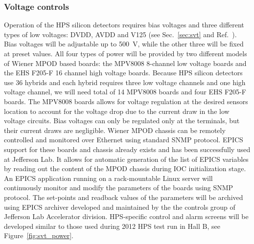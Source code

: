 \subsubsection{Voltage controls}
\label{sec:ctrls:voltage}
Operation of the HPS silicon detectors requires bias voltages and three different types of low voltages: DVDD, 
AVDD and V125 (see Sec.~\ref{sec:svt} and Ref.~\cite{HPS_PROP}). Bias voltages will be adjustable up to 
500~\textmd{V}, while the other three will be fixed  at preset values. All four types of power  
will be provided by two different models of Wiener MPOD based boards: the MPV8008 8-channel low voltage boards and 
the EHS F205-F 16 channel high voltage boards. Because HPS silicon detectors use 36 hybrids and each hybrid requires 
three low voltage channels and one high voltage channel, we will need total of 14 MPV8008 boards and four EHS F205-F boards. 
The MPV8008 boards allows for voltage regulation at the desired sensors location to account for the voltage drop due to the 
current draw in the low voltage circuits. Bias voltages can only be regulated only at the terminals, 
but their current draws are negligible. Wiener MPOD chassis can be remotely controlled and monitored over Ethernet using 
standard SNMP protocol. EPICS support for these boards and chassis already exists and has been successfully used at Jefferson Lab. 
It allows for automatic generation of the list of EPICS variables  by reading out the content of the MPOD chassis 
during IOC initialization stage. An EPICS application running on a rack-mountable Linux server will  
continuously monitor and modify the parameters of the boards using SNMP protocol.  
The set-points and readback values of the parameters will be archived using EPICS archiver developed and maintained 
by the the controls group of Jefferson Lab Accelerator division. 
HPS-specific control and alarm screens will be developed similar to those used during 2012 HPS test run in 
Hall B, see Figure~\ref{fig:svt_power}. 
  
